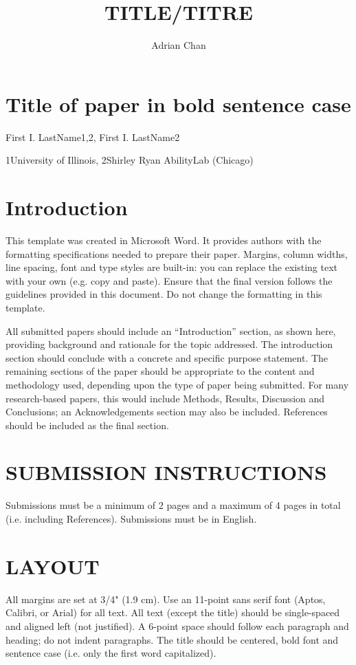 \documentclass{article}
\title{TITLE/TITRE}
\author{Adrian Chan}
\begin{document}
\maketitle

\section{Title of paper in bold sentence case}

First I. LastName1,2, First I. LastName2

1University of Illinois, 2Shirley Ryan AbilityLab (Chicago)

\section{Introduction}

This template was created in Microsoft Word. It provides authors with the formatting specifications needed to prepare their paper. Margins, column widths, line spacing, font and type styles are built-in: you can replace the existing text with your own (e.g. copy and paste). Ensure that the final version follows the guidelines provided in this document. Do not change the formatting in this template.

All submitted papers should include an “Introduction” section, as shown here, providing background and rationale for the topic addressed. The introduction section should conclude with a concrete and specific purpose statement. The remaining sections of the paper should be appropriate to the content and methodology used, depending upon the type of paper being submitted. For many research-based papers, this would include Methods, Results, Discussion and Conclusions; an Acknowledgements section may also be included. References should be included as the final section.

\section{SUBMISSION INSTRUCTIONS}

Submissions must be a minimum of 2 pages and a maximum of 4 pages in total (i.e. including References). Submissions must be in English. 

\section{LAYOUT}

All margins are set at 3/4" (1.9 cm). Use an 11-point sans serif font (Aptos, Calibri, or Arial) for all text. All text (except the title) should be single-spaced and aligned left (not justified). A 6-point space should follow each paragraph and heading; do not indent paragraphs. The title should be centered, bold font and sentence case (i.e. only the first word capitalized). 
\end{document}
